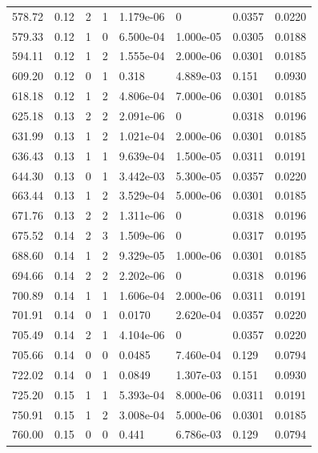\documentclass[preview]{standalone}
\begin{document}
{{{\begin{tabular}{L{1.2cm}C{1.2cm} C{0.3cm}C{0.5cm} C{1.4cm}C{1.4cm} C{1.4cm}C{1.4cm}}
  578.72  &  0.12  & 2     &  1 &  1.179e-06  & 0  & 0.0357 &  0.0220   \\ 
  579.33  &  0.12  & 1     &  0 &  6.500e-04  & 1.000e-05  & 0.0305 &  0.0188   \\ 
  594.11  &  0.12  & 1     &  2 &  1.555e-04  & 2.000e-06  & 0.0301 &  0.0185   \\ 
  609.20  &  0.12  & 0     &  1 &  0.318  & 4.889e-03  & 0.151 &  0.0930   \\ 
  618.18  &  0.12  & 1     &  2 &  4.806e-04  & 7.000e-06  & 0.0301 &  0.0185   \\ 
  625.18  &  0.13  & 2     &  2 &  2.091e-06  & 0  & 0.0318 &  0.0196   \\ 
  631.99  &  0.13  & 1     &  2 &  1.021e-04  & 2.000e-06  & 0.0301 &  0.0185   \\ 
  636.43  &  0.13  & 1     &  1 &  9.639e-04  & 1.500e-05  & 0.0311 &  0.0191   \\ 
  644.30  &  0.13  & 0     &  1 &  3.442e-03  & 5.300e-05  & 0.0357 &  0.0220   \\ 
  663.44  &  0.13  & 1     &  2 &  3.529e-04  & 5.000e-06  & 0.0301 &  0.0185   \\ 
  671.76  &  0.13  & 2     &  2 &  1.311e-06  & 0  & 0.0318 &  0.0196   \\ 
  675.52  &  0.14  & 2     &  3 &  1.509e-06  & 0  & 0.0317 &  0.0195   \\ 
  688.60  &  0.14  & 1     &  2 &  9.329e-05  & 1.000e-06  & 0.0301 &  0.0185   \\ 
  694.66  &  0.14  & 2     &  2 &  2.202e-06  & 0  & 0.0318 &  0.0196   \\ 
  700.89  &  0.14  & 1     &  1 &  1.606e-04  & 2.000e-06  & 0.0311 &  0.0191   \\ 
  701.91  &  0.14  & 0     &  1 &  0.0170  & 2.620e-04  & 0.0357 &  0.0220   \\ 
  705.49  &  0.14  & 2     &  1 &  4.104e-06  & 0  & 0.0357 &  0.0220   \\ 
  705.66  &  0.14  & 0     &  0 &  0.0485  & 7.460e-04  & 0.129 &  0.0794   \\ 
  722.02  &  0.14  & 0     &  1 &  0.0849  & 1.307e-03  & 0.151 &  0.0930   \\ 
  725.20  &  0.15  & 1     &  1 &  5.393e-04  & 8.000e-06  & 0.0311 &  0.0191   \\ 
  750.91  &  0.15  & 1     &  2 &  3.008e-04  & 5.000e-06  & 0.0301 &  0.0185   \\ 
  760.00  &  0.15  & 0     &  0 &  0.441  & 6.786e-03  & 0.129 &  0.0794   \\ 

\end{tabular}}}}
\end{document}

